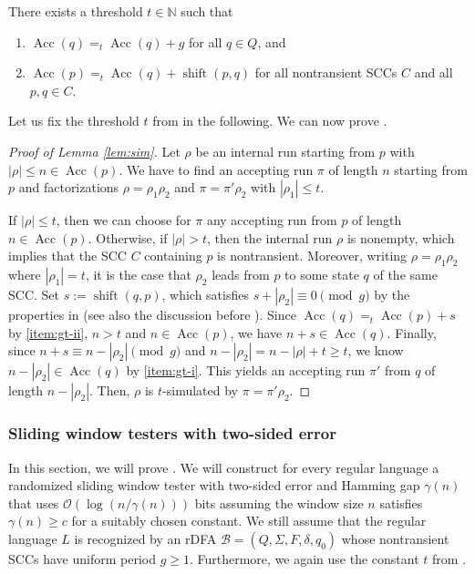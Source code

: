\documentclass{article}\usepackage[a4paper,margin=20mm]{geometry}
\newcommand{\N}{\mathbb{N}}
\newcommand{\B}{\mathcal{B}}
\renewcommand{\O}{\mathcal{O}}
\DeclareMathOperator{\shift}{shift}
\DeclareMathOperator{\Acc}{Acc}
\renewcommand{\geq}{\geqslant}
\renewcommand{\leq}{\leqslant}
\renewcommand{\ge}{\geq}
\renewcommand{\le}{\leq}
\begin{document}
\begin{corollary}
\label{cor:gt}
There exists a threshold $t \in \N$ such that
\begin{enumerate}[label=(\roman{*}), ref=(\roman{*})]
	\item $\Acc(q) =_t \Acc(q) + g$ for all $q \in Q$, and \label{item:gt-i}
	\item $\Acc(p) =_t \Acc(q) + \shift(p,q)$ for all nontransient SCCs $C$ and all $p,q \in C$.
	\label{item:gt-ii}
\end{enumerate}
\end{corollary}

Let us fix the threshold $t$ from  in the following.
We can now prove .

\begin{proof}[Proof of Lemma \ref{lem:sim}]
Let $\rho$ be an internal run starting from $p$ with $|\rho| \leq n \in \Acc(p)$.
We have to find an accepting run $\pi$ of length $n$ starting from $p$ and factorizations 
$\rho = \rho_1 \rho_2$ and $\pi = \pi' \rho_2$ with $|\rho_1| \le t$.

If $|\rho| \le t$, then we can choose for $\pi$ any accepting run from $p$ of length $n \in \Acc(p)$.
Otherwise, if $|\rho| > t$, then the internal run $\rho$ is nonempty, which implies that the 
SCC $C$ containing $p$ is nontransient.
Moreover, writing $\rho = \rho_1 \rho_2$ where $|\rho_1| = t$, it is the case
that $\rho_2$ leads from $p$ to some state $q$ of the same SCC.
Set $s := \shift(q,p)$, which satisfies $s + |\rho_2| \equiv 0 \pmod g$
by the properties in  (see also the discussion before ).
Since $\Acc(q) =_t \Acc(p) + s$ by \ref{item:gt-ii}, $n > t$ and $n \in \Acc(p)$,
we have $n + s \in \Acc(q)$.
Finally, since $n + s \equiv n-|\rho_2| \pmod g$ and $n-|\rho_2| = n-|\rho|+t \ge t$,
we know $n-|\rho_2| \in \Acc(q)$ by \ref{item:gt-i}.
This yields an accepting run $\pi'$ from $q$ of length $n-|\rho_2|$.
Then, $\rho$ is $t$-simulated by $\pi = \pi' \rho_2$.
\end{proof}

\subsubsection{Sliding window testers with two-sided error}
\label{sec:two-sided}

In this section, we will prove .
We will construct for every regular language a randomized sliding window tester
with two-sided error and Hamming gap $\gamma(n)$ that uses $\O(\log(n/\gamma(n)))$ bits
assuming the window size $n$ satisfies $\gamma(n) \geq c$ for a suitably chosen constant.
We still assume that the regular language $L$
is recognized by an rDFA $\B = (Q,\Sigma,F,\delta,q_0)$
whose nontransient SCCs have uniform period $g \ge 1$.
Furthermore, we again use the constant $t$ from .
\end{document}
